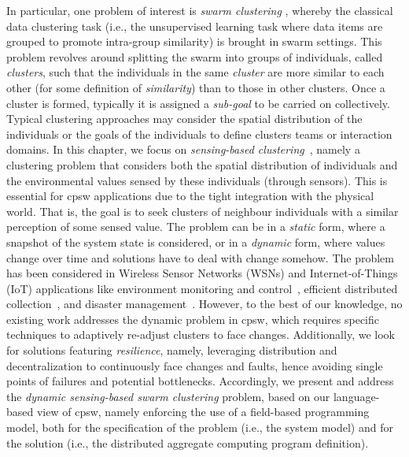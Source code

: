 In particular, one problem of interest is \emph{swarm clustering} \cite{DBLP:conf/smc/LeeKK05,DBLP:journals/asc/CruzNM17},
 whereby the classical data clustering task
 (i.e., the unsupervised learning task where data items are grouped to promote intra-group similarity)
 is brought in swarm settings.
%
This problem revolves around splitting the swarm
 into groups of individuals, called \emph{clusters},
 such that the individuals in the same \emph{cluster}
 are more similar to each other (for some definition of \emph{similarity}) than to those in other clusters.
%
Once a cluster is formed, typically it is assigned a \emph{sub-goal} to be carried on collectively.
%
Typical clustering approaches may consider
 the spatial distribution of the individuals
 or the goals of the individuals to define clusters
  teams or interaction domains.
%
In this chapter, 
 we focus on \emph{sensing-based clustering}~\cite{DBLP:conf/ccnc/LinM07}, namely
 a clustering problem
 that considers both the spatial distribution of individuals
 and the environmental values sensed by these individuals (through sensors).
 This is essential for \ac{cpsw} applications due to the tight integration with the physical world.
%
That is, the goal is to seek clusters of neighbour individuals with a similar perception of some sensed value.
%
The problem can be in a \emph{static} form,
 where a snapshot of the system state is considered,
 or in a \emph{dynamic} form,
 where values change over time
 and solutions have to deal with change somehow.
%
The problem has been considered in Wireless Sensor Networks (WSNs) and Internet-of-Things (IoT) applications like
  environment monitoring and control~\cite{DBLP:conf/ccnc/LinM07},
  efficient distributed collection~\cite{DBLP:journals/ijcomsys/PhamLPC10},
  and disaster management~\cite{DBLP:journals/jaihc/KucukBSK20}.
%
However, to the best of our knowledge, 
 no existing work addresses the dynamic problem in \ac{cpsw}, which requires specific
techniques to adaptively re-adjust clusters to face changes.
%
Additionally, we look for solutions featuring \emph{resilience}, namely,
 leveraging distribution and decentralization to continuously face changes and faults, hence avoiding single points of failures and potential bottlenecks.
%
Accordingly, we present and address the \emph{dynamic sensing-based swarm clustering} problem,
 based on our language-based view of \ac{cpsw}, 
 namely enforcing the use of a field-based programming model, 
 both for the specification of the problem (i.e., the system model) and for the solution (i.e., the distributed aggregate computing program definition).  
